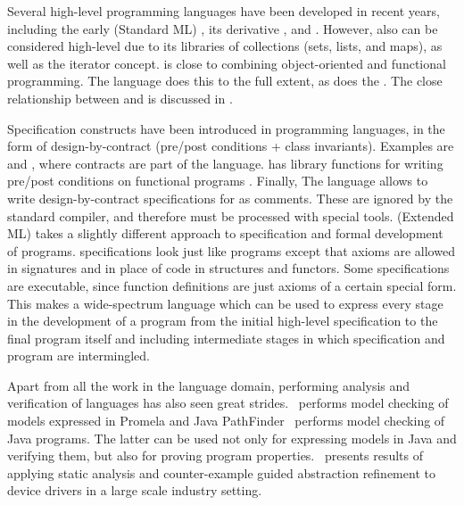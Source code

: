 Several high-level programming languages have been developed in recent
years, including the early \sml{} (Standard ML) \cite{standard-ml-97},
its derivative \ocaml{} \cite{ocaml}, and \haskell{}
\cite{haskell}. However, also \java{} can be considered high-level due
to its libraries of collections (sets, lists, and maps), as well as
the iterator concept. \python{} \cite{python} is close to combining
object-oriented and functional programming. The \scala{} \cite{scala}
language does this to the full extent, as does the \fortress{}
\cite{fortress}. The close relationship between \scala{} and \vdm{} is discussed in
\cite{havelund-scala-vdm-12}.

Specification constructs have been introduced in programming
languages, in the form of design-by-contract (pre/post conditions +
class invariants). Examples are \eiffel{} \cite{eiffel} and
\specsharp{} \cite{specsharp}, where contracts are part of the
language. \scala{} has library functions for writing pre/post
conditions on functional programs \cite{odersky-rv10}. Finally, The
\jml{} language \cite{jml} allows to write design-by-contract
specifications for \java{} as comments. These are ignored by the
standard \java{} compiler, and therefore must be processed with
special tools. \eml{} (Extended ML) \cite{sannella-eml-97} takes a
slightly different approach to specification and formal development of
\sml{} programs.  \eml{} specifications look just like \sml{} programs
except that axioms are allowed in signatures and in place of code in
structures and functors. Some \eml{} specifications are executable,
since \sml{} function definitions are just axioms of a certain special
form. This makes \eml{} a wide-spectrum language which can be used to
express every stage in the development of a \sml{} program from the
initial high-level specification to the final program itself and
including intermediate stages in which specification and program are
intermingled.

Apart from all the work in the language domain, performing analysis
and verification of languages has also seen great
strides.~\cite{holzmann-spin-2004} performs model checking of models
expressed in Promela and Java
PathFinder~\cite{havelund-jpf-00,havelund-visser02} performs model
checking of Java programs. The latter can be used not only for
expressing models in Java and verifying them, but also for proving
program properties.~\cite{ball2010slam2} presents results of applying
static analysis and counter-example guided abstraction refinement to
device drivers in a large scale industry setting. 


